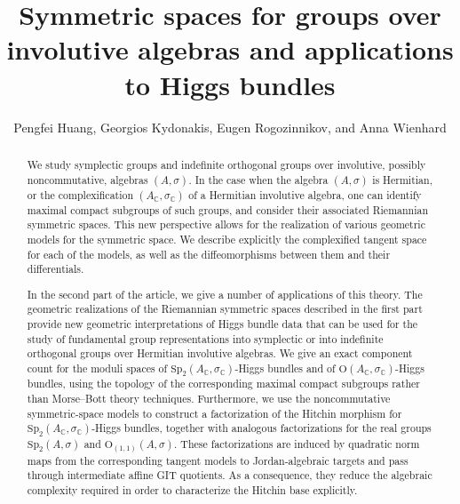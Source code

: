 \documentclass[oneside,11pt]{amsart}
\title[Symmetric spaces for groups over involutive algebras]{Symmetric spaces for groups over involutive algebras and applications to Higgs bundles}
\author{Pengfei Huang, Georgios Kydonakis, Eugen Rogozinnikov, and Anna Wienhard}
\theoremstyle{definition}
\theoremstyle{remark}
\numberwithin{thm}{section}
\numberwithin{equation}{section}
\begin{document}

\begin{abstract}

We study symplectic groups and indefinite orthogonal groups over involutive, possibly noncommutative, algebras $(A, \sigma)$. In the case when the algebra $(A, \sigma)$ is Hermitian, or the complexification $(A_{\mathbb{C}}, \sigma_{\mathbb{C}})$ of a Hermitian involutive algebra, one can identify maximal compact subgroups of such groups, and consider their associated Riemannian symmetric spaces. This new perspective allows for the realization of various geometric models for the symmetric space. We describe explicitly the complexified tangent space for each of the models, as well as the diffeomorphisms between them and their differentials.

In the second part of the article, we give a number of applications of this theory. 
The geometric realizations of the Riemannian symmetric spaces described in the first part provide new geometric interpretations of Higgs bundle data that can be used for the study of fundamental group representations into symplectic or into indefinite orthogonal groups over Hermitian involutive algebras. 
We give an exact component count for the moduli spaces of $\mathrm{Sp}_2(A_{\mathbb{C}}, \sigma_{\mathbb{C}})$-Higgs bundles and of $\mathrm{O}(A_{\mathbb{C}}, \sigma_{\mathbb{C}})$-Higgs bundles, using the topology of the corresponding
maximal compact subgroups rather than Morse--Bott theory techniques. 
Furthermore, we use the noncommutative symmetric-space models to construct a factorization of the Hitchin morphism for $\mathrm{Sp}_2(A_{\mathbb C},\sigma_{\mathbb C})$-Higgs bundles, together with analogous factorizations for the real groups
$\mathrm{Sp}_2(A,\sigma)$ and $\mathrm{O}_{(1,1)}(A,\sigma)$. These factorizations are induced by quadratic norm maps from the corresponding tangent models to Jordan-algebraic targets and
pass through intermediate affine GIT quotients. As a consequence, they reduce the algebraic complexity required in order to characterize the Hitchin base explicitly.
\end{abstract}

\maketitle

\flushbottom

\tableofcontents
\end{document}
